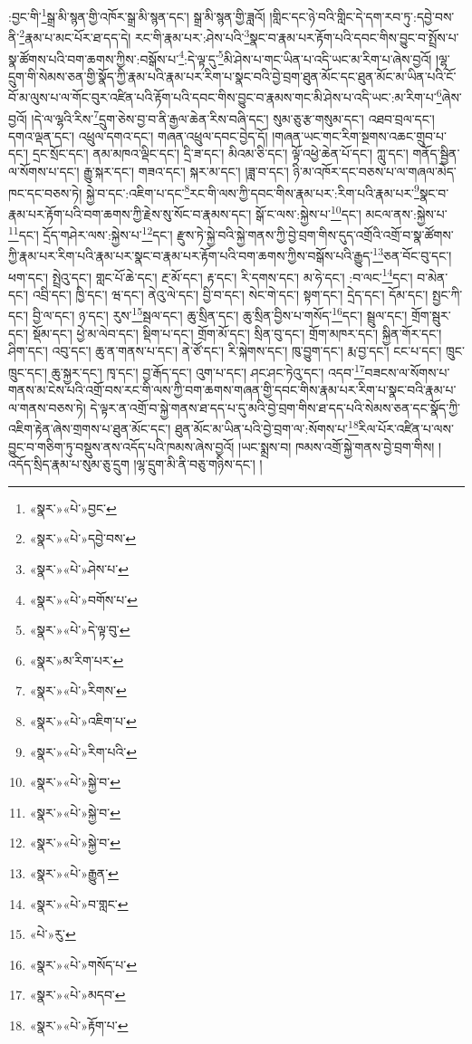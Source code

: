 :བྱང་གི་\footnote{«སྣར་»«པེ་»བྱང་}སྒྲ་མི་སྙན་གྱི་འཁོར་སྒྲ་མི་སྙན་དང་། སྒྲ་མི་སྙན་གྱི་ཟླའོ། །གླིང་དང་ཉེ་བའི་གླིང་དེ་དག་རབ་ཏུ་:དབྱེ་བས་ནི་\footnote{«སྣར་»«པེ་»དབྱེ་བས་}རྣམ་པ་མང་པོར་ཐ་དད་དེ། རང་གི་རྣམ་པར་:ཤེས་པའི་\footnote{«སྣར་»«པེ་»ཤེས་པ་}སྣང་བ་རྣམ་པར་རྟོག་པའི་དབང་གིས་བྱུང་བ་སྤྲོས་པ་སྣ་ཚོགས་པའི་བག་ཆགས་ཀྱིས་:བསྒོས་པ་\footnote{«སྣར་»«པེ་»བགོས་པ་}:དེ་ལྟ་དུ་\footnote{«སྣར་»«པེ་»དེ་ལྟ་བུ་}མི་ཤེས་པ་གང་ཡིན་པ་འདི་ཡང་མ་རིག་པ་ཞེས་བྱའོ། །ལྷ་དྲུག་གི་སེམས་ཅན་གྱི་སྣོད་ཀྱི་རྣམ་པའི་རྣམ་པར་རིག་པ་སྣང་བའི་བྱེ་བྲག་ཐུན་མོང་དང་ཐུན་མོང་མ་ཡིན་པའི་ངོ་བོ་མ་ལུས་པ་ལ་གོང་བུར་འཛིན་པའི་རྟོག་པའི་དབང་གིས་བྱུང་བ་རྣམས་གང་མི་ཤེས་པ་འདི་ཡང་:མ་རིག་པ་\footnote{«སྣར་»མ་རིག་པར་}ཞེས་བྱའོ། །དེ་ལ་ལྷའི་རིས་\footnote{«སྣར་»«པེ་»རིགས་}དྲུག་ཅེས་བྱ་བ་ནི་རྒྱལ་ཆེན་རིས་བཞི་དང་། སུམ་ཅུ་རྩ་གསུམ་དང་། འཐབ་བྲལ་དང་། དགའ་ལྡན་དང་། འཕྲུལ་དགའ་དང་། གཞན་འཕྲུལ་དབང་བྱེད་དོ། །གཞན་ཡང་གང་རིག་སྔགས་འཆང་གྲུབ་པ་དང་། དྲང་སྲོང་དང་། ནམ་མཁའ་ལྡིང་དང་། དྲི་ཟ་དང་། མིའམ་ཅི་དང་། ལྟོ་འཕྱེ་ཆེན་པོ་དང་། ཀླུ་དང་། གནོད་སྦྱིན་ལ་སོགས་པ་དང་། རྒྱུ་སྐར་དང་། གཟའ་དང་། སྐར་མ་དང་། །ཟླ་བ་དང་། ཉི་མ་འཁོར་དང་བཅས་པ་ལ་གཞལ་མེད་ཁང་དང་བཅས་ཏེ། སྐྱེ་བ་དང་:འཇིག་པ་དང་\footnote{«སྣར་»«པེ་»འཇིག་པ་}རང་གི་ལས་ཀྱི་དབང་གིས་རྣམ་པར་:རིག་པའི་རྣམ་པར་\footnote{«སྣར་»«པེ་»རིག་པའི་}སྣང་བ་རྣམ་པར་རྟོག་པའི་བག་ཆགས་ཀྱི་རྗེས་སུ་སོང་བ་རྣམས་དང་། སྒོ་ང་ལས་:སྐྱེས་པ་\footnote{«སྣར་»«པེ་»སྐྱེ་བ་}དང་། མངལ་ནས་:སྐྱེས་པ་\footnote{«སྣར་»«པེ་»སྐྱེ་བ་}དང་། དྲོད་གཤེར་ལས་:སྐྱེས་པ་\footnote{«སྣར་»«པེ་»སྐྱེ་བ་}དང་། རྫུས་ཏེ་སྐྱེ་བའི་སྐྱེ་གནས་ཀྱི་བྱེ་བྲག་གིས་དུད་འགྲོའི་འགྲོ་བ་སྣ་ཚོགས་ཀྱི་རྣམ་པར་རིག་པའི་རྣམ་པར་སྣང་བ་རྣམ་པར་རྟོག་པའི་བག་ཆགས་ཀྱིས་བསྒོས་པའི་རྒྱུད་\footnote{«སྣར་»«པེ་»རྒྱུན་}ཅན་བོང་བུ་དང་། ཕག་དང་། སྤྲེའུ་དང་། གླང་པོ་ཆེ་དང་། རྔ་མོ་དང་། རྟ་དང་། རི་དགས་དང་། མ་ཧེ་དང་། :བ་ལང་\footnote{«སྣར་»«པེ་»བ་གླང་}དང་། བ་མེན་དང་། འབྲི་དང་། ཁྱི་དང་། ཝ་དང་། ནེའུ་ལེ་དང་། བྱི་བ་དང་། སེང་གེ་དང་། སྟག་དང་། དྲེད་དང་། དོམ་དང་། སྤྱང་ཀི་དང་། བྱི་ལ་དང་། ཉ་དང་། རུས་\footnote{«པེ་»རུ་}སྦལ་དང་། ཆུ་སྲིན་དང་། ཆུ་སྲིན་བྱིས་པ་གསོད་\footnote{«སྣར་»«པེ་»གསོད་པ་}དང་། སྦྲུལ་དང་། གྲོག་སྦུར་དང་། སྡོམ་དང་། ཕྱེ་མ་ལེབ་དང་། སྡིག་པ་དང་། གྲོག་མོ་དང་། སྲིན་བུ་དང་། གྲོག་མཁར་དང་། སྐྱིན་གོར་དང་། ཤིག་དང་། འབུ་དང་། ཆུ་ན་གནས་པ་དང་། ནེ་ཙོ་དང་། རི་སྐེགས་དང་། ཁུ་བྱུག་དང་། རྨ་བྱ་དང་། ངང་པ་དང་། ཁྲུང་ཁྲུང་དང་། ཆུ་སྐྱར་དང་། ཁྭ་དང་། བྱ་རྒོད་དང་། འུག་པ་དང་། ཤང་ཤང་ཏེའུ་དང་། འདབ་\footnote{«སྣར་»«པེ་»མདབ་}བཟངས་ལ་སོགས་པ་གནས་མ་ངེས་པའི་འགྲོ་བས་རང་གི་ལས་ཀྱི་བག་ཆགས་གཞན་གྱི་དབང་གིས་རྣམ་པར་རིག་པ་སྣང་བའི་རྣམ་པ་ལ་གནས་བཅས་ཏེ། དེ་ལྟར་ན་འགྲོ་བ་སྐྱེ་གནས་ཐ་དད་པ་དུ་མའི་བྱེ་བྲག་གིས་ཐ་དད་པའི་སེམས་ཅན་དང་སྣོད་ཀྱི་འཇིག་རྟེན་ཞེས་གྲགས་པ་ཐུན་མོང་དང་། ཐུན་མོང་མ་ཡིན་པའི་བྱེ་བྲག་ལ་:སོགས་པ་\footnote{«སྣར་»«པེ་»རྟོག་པ་}རིལ་པོར་འཛིན་པ་ལས་བྱུང་བ་གཅིག་ཏུ་བསྡུས་ནས་འདོད་པའི་ཁམས་ཞེས་བྱའོ། །ཡང་སྨྲས་བ། ཁམས་འགྲོ་སྐྱེ་གནས་བྱེ་བྲག་གིས། །འདོད་སྲིད་རྣམ་པ་སུམ་ཅུ་དྲུག །ལྷ་དྲུག་མི་ནི་བཅུ་གཉིས་དང་། །
